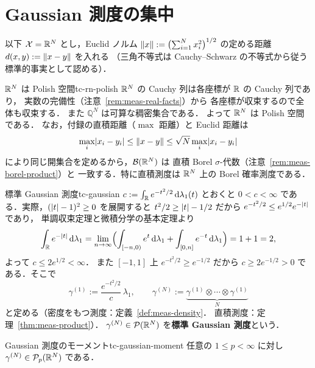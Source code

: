 \section{Gaussian 測度の集中}
\label{sec:tc-gaussian}

以下 $\mathcal{X}=\mathbb{R}^N$ とし，Euclid ノルム
$\lVert x \rVert:=\bigl(\sum_{i=1}^Nx_i^2\bigr)^{1/2}$ の定める距離
$d(x,y):=\lVert x-y \rVert$ を入れる
（三角不等式は Cauchy--Schwarz の不等式から従う標準的事実として認める）．

\begin{remark}{$\mathbb{R}^N$ は Polish 空間}{tc-rn-polish}
  $\mathbb{R}^N$ の Cauchy 列は各座標が $\mathbb{R}$ の Cauchy 列であり，
  実数の完備性（注意~\ref{rem:meas-real-facts}）から
  各座標が収束するので全体も収束する．
  また $\mathbb{Q}^N$ は可算な稠密集合である．
  よって $\mathbb{R}^N$ は Polish 空間である．
  なお，付録の直積距離（$\max$ 距離）と Euclid 距離は
  \[
    \max_i\lvert x_i-y_i \rvert\leq\lVert x-y \rVert\leq\sqrt{N}\max_i\lvert x_i-y_i \rvert
  \]
  により同じ開集合を定めるから，$\mathcal{B}(\mathbb{R}^N)$ は
  直積 Borel $\sigma$-代数（注意~\ref{rem:meas-borel-product}）と
  一致する．特に直積測度は $\mathbb{R}^N$ 上の Borel 確率測度である．
\end{remark}

\begin{definition}{標準 Gaussian 測度}{tc-gaussian}
  $c:=\int_{\mathbb{R}} e^{-t^2/2}\,\mathrm{d}\lambda_1(t)$ とおくと
  $0<c<\infty$ である．実際，$(\lvert t \rvert-1)^2\geq0$ を展開すると
  $t^2/2\geq\lvert t \rvert-1/2$ だから
  $e^{-t^2/2}\leq e^{1/2}e^{-\lvert t \rvert}$ であり，
  単調収束定理と微積分学の基本定理より
  \[
    \int_{\mathbb{R}} e^{-\lvert t \rvert}\,\mathrm{d}\lambda_1
    =\lim_{n\to\infty}\Bigl(
    \int_{[-n,0)}e^{t}\,\mathrm{d}\lambda_1+\int_{[0,n]}e^{-t}\,\mathrm{d}\lambda_1
    \Bigr)
    =1+1=2,
  \]
  よって $c\leq2e^{1/2}<\infty$．
  また $[-1,1]$ 上 $e^{-t^2/2}\geq e^{-1/2}$ だから
  $c\geq2e^{-1/2}>0$ である．そこで
  \[
    \gamma^{(1)}:=\frac{e^{-t^2/2}}{c}\,\lambda_1,
    \qquad
    \gamma^{(N)}:=
    \underbrace{\gamma^{(1)}\otimes\cdots\otimes\gamma^{(1)}}_{N}
  \]
  と定める（密度をもつ測度：定義~\ref{def:meas-density}．
  直積測度：定理~\ref{thm:meas-product}）．
  $\gamma^{(N)}\in\mathcal{P}(\mathbb{R}^N)$ を\textbf{標準 Gaussian 測度}という．
\end{definition}

\begin{lemma}{Gaussian 測度のモーメント}{tc-gaussian-moment}
  任意の $1\leq p<\infty$ に対し $\gamma^{(N)}\in\mathcal{P}_{p}(\mathbb{R}^N)$ である．
\end{lemma}

